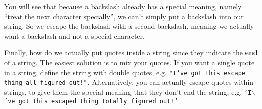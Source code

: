 You will see that because a backslash already has a special meaning,   namely ``treat the next character specially'', we can't simply put a   backslash into our string. So we escape the backslash with a second   backslash, meaning we actually want a backslash and not a special   character.

Finally, how do we actually put quotes inside a string since they   indicate the \textbf{end} of a string. The easiest solution is   to mix your quotes. If you want a single quote in a string, define the   string with double quotes, e.g.  
\texttt{"I've got this escape thing all figured out!"}. Alternatively, you can actually escape quotes   within strings, to give them the special meaning that they don't end   the string, e.g. 
\texttt{'I$\backslash$'ve got this escaped thing totally figured out!'}

